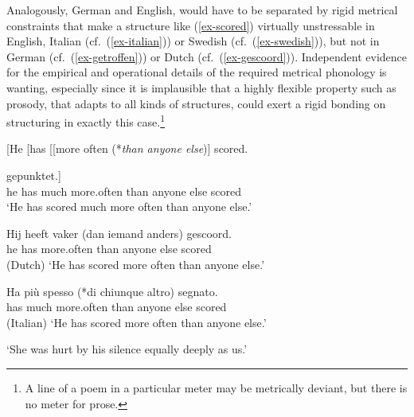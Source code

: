 \documentclass[output=paper
  ,nobabel
  ,uniformtopskip %
]{langscibook}
\begin{document}
\label{ex-muchsmaller}

\label{ex-building}
\zl

\largerpage[2]
\noindent
Analogously, German and English, would have to be separated by rigid metrical constraints that make a structure like (\ref{ex-scored}) virtually unstressable in English, Italian (cf.\ (\ref{ex-italian})) or Swedish (cf.\ (\ref{ex-swedish})), but not in German (cf.\ (\ref{ex-getroffen})) or Dutch (cf.\ (\ref{ex-gescoord})). Independent evidence for the empirical and operational details of the required metrical phonology is wanting, especially since it is implausible that a highly flexible property such as prosody, that adapts to all kinds of structures, could exert a rigid bonding on structuring in exactly this case.\footnote{A line of a poem in a particular meter may be metrically deviant, but there is no meter for prose.}

\eal
\ex\label{ex-scored}
[He [has [[more often (*\emph{than anyone else})] scored.

\ex\label{ex-getroffen}
\gll [Er [hat [[viel öfter (als jeder andere)] gepunktet.] \\
\spacebr{}he \spacebr{}has \hphantom{[[}much more.often \spacebr{}than anyone else scored \\%
\glt `He has scored much more often than anyone else.'

\ex\label{ex-gescoord}
\gll Hij heeft vaker      (dan iemand anders) gescoord. \\
     he  has   more.often \spacebr{}than anyone else scored \\\hfill(Dutch)
\glt `He has scored more often than anyone else.'

\ex\label{ex-italian}
\gll Ha  più  spesso (*di              chiunque altro)  segnato. \\
     has much more.often  \hphantom{(*}than anyone   else scored \\\hfill(Italian)
\glt `He has scored more often than anyone else.'

\ex\label{ex-swedish}
\glt `She was hurt by his silence equally deeply as us.'
\zl
\end{document}
